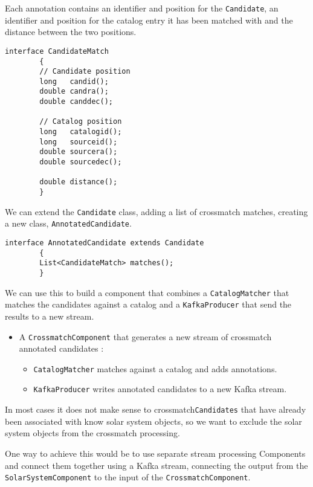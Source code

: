 \documentclass{article}
\newcommand{\kafka} {Kafka\xspace}
\newcommand{\crossmatch} {crossmatch\xspace}
\begin{document}
Each annotation contains an identifier and position for the \texttt{Candidate}, an identifier and position for the catalog entry it has been matched with and the distance between the two positions.

\begin{lstlisting}[style=Java]
    interface CandidateMatch
        {
        // Candidate position
        long   candid();
        double candra();
        double canddec();

        // Catalog position
        long   catalogid();
        long   sourceid();
        double sourcera();
        double sourcedec();

        double distance();
        }
\end{lstlisting}

We can extend the \texttt{Candidate} class, adding a list of \crossmatch matches, creating a new class, \texttt{AnnotatedCandidate}.

\begin{lstlisting}[style=Java]
    interface AnnotatedCandidate extends Candidate
        {
        List<CandidateMatch> matches();
        }
\end{lstlisting}

We can use this to build a component that combines a \texttt{CatalogMatcher} that matches the candidates against a catalog and a \texttt{KafkaProducer} that send the results to a new stream.

\begin{itemize}
    \item A \texttt{CrossmatchComponent} that generates a new stream of \crossmatch annotated candidates :
    \begin{itemize}
        \item \texttt{CatalogMatcher} matches against a catalog and adds annotations.
    \end{itemize}
    \begin{itemize}
        \item \texttt{KafkaProducer} writes annotated candidates to a new Kafka stream.
    \end{itemize}
\end{itemize}

In most cases it does not make sense to \crossmatch \texttt{Candidates} that have already been associated with know solar system objects, so we want to exclude the solar system objects from the \crossmatch processing.

One way to achieve this would be to use separate stream processing Components and connect them together using a \kafka stream, connecting the output from the \texttt{SolarSystemComponent} to the input of the \texttt{CrossmatchComponent}.
\end{document}
